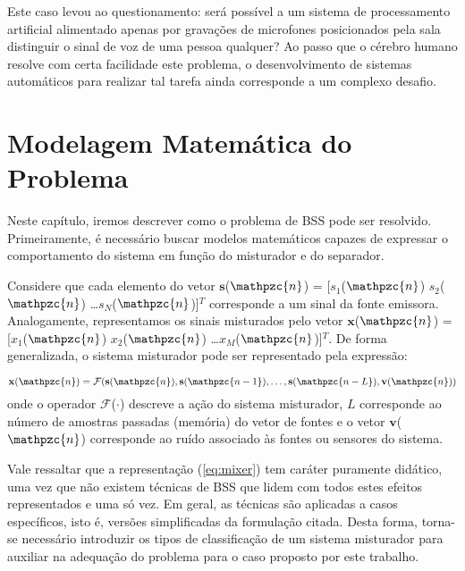     Este caso levou ao questionamento: será possível a um sistema de processamento artificial alimentado apenas por gravações de microfones posicionados pela sala distinguir o sinal de voz de uma pessoa qualquer? Ao passo que o cérebro humano resolve com certa facilidade este problema, o desenvolvimento de sistemas automáticos para realizar tal tarefa ainda corresponde a um complexo desafio.

\section{Modelagem Matemática do Problema}\label{sec:model}
    Neste capítulo, iremos descrever como o problema de BSS pode ser resolvido. Primeiramente, é necessário buscar modelos matemáticos capazes de expressar o comportamento do sistema em função do misturador e do separador.
    
    Considere que cada elemento do vetor $\mathbf{s}$($\mathpzc{n}$) = [${s_1}$($\mathpzc{n}$) ${s_2}$($\mathpzc{n}$) \dots  $s_N$($\mathpzc{n}$)]$^T$ corresponde a um sinal da fonte emissora. Analogamente, representamos os sinais misturados pelo vetor  $\mathbf{x}$($\mathpzc{n}$) = [${x_1}$($\mathpzc{n}$) ${x_2}$($\mathpzc{n}$) \dots  ${x_M}$($\mathpzc{n}$)]$^T$. De forma generalizada, o sistema misturador pode ser representado pela expressão:

    \begin{equation}\label{eq:mixer}
        \mathbf{x}(\mathpzc{n}) = \mathcal{F}(\mathbf{s}(\mathpzc{n}), \mathbf{s}(\mathpzc{n-1}), \dots, \mathbf{s}(\mathpzc{n - L}), \mathbf{v}(\mathpzc{n}))
    \end{equation}
    onde o operador $\mathcal{F}$($\cdot$) descreve a ação do sistema misturador, $L$ corresponde ao número de amostras passadas (memória) do vetor de fontes e o vetor $\mathbf{v}$($\mathpzc{n}$) corresponde ao ruído associado às fontes ou sensores do sistema.
    
    Vale ressaltar que a representação (\ref{eq:mixer}) tem caráter puramente didático, uma vez que não existem técnicas de BSS que lidem com todos estes efeitos representados e uma só vez. Em geral, as técnicas são aplicadas a casos específicos, isto é, versões simplificadas da formulação citada. Desta forma, torna-se necessário introduzir os tipos de classificação de um sistema misturador para auxiliar na adequação do problema para o caso proposto por este trabalho.
    
